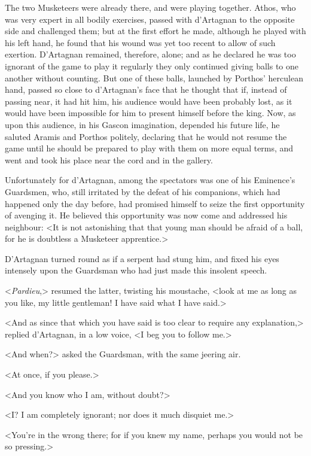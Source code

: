 The two Musketeers were already there, and were playing together. Athos, who was very expert in all bodily exercises, passed with d'Artagnan to the opposite side and challenged them; but at the first effort he made, although he played with his left hand, he found that his wound was yet too recent to allow of such exertion. D'Artagnan remained, therefore, alone; and as he declared he was too ignorant of the game to play it regularly they only continued giving balls to one another without counting. But one of these balls, launched by Porthos' herculean hand, passed so close to d'Artagnan's face that he thought that if, instead of passing near, it had hit him, his audience would have been probably lost, as it would have been impossible for him to present himself before the king. Now, as upon this audience, in his Gascon imagination, depended his future life, he saluted Aramis and Porthos politely, declaring that he would not resume the game until he should be prepared to play with them on more equal terms, and went and took his place near the cord and in the gallery. 

Unfortunately for d'Artagnan, among the spectators was one of his Eminence's Guardsmen, who, still irritated by the defeat of his companions, which had happened only the day before, had promised himself to seize the first opportunity of avenging it. He believed this opportunity was now come and addressed his neighbour: <It is not astonishing that that young man should be afraid of a ball, for he is doubtless a Musketeer apprentice.> 

D'Artagnan turned round as if a serpent had stung him, and fixed his eyes intensely upon the Guardsman who had just made this insolent speech. 

<\textit{Pardieu},> resumed the latter, twisting his moustache, <look at me as long as you like, my little gentleman! I have said what I have said.> 

<And as since that which you have said is too clear to require any explanation,> replied d'Artagnan, in a low voice, <I beg you to follow me.> 

<And when?> asked the Guardsman, with the same jeering air. 

<At once, if you please.> 

<And you know who I am, without doubt?> 

<I? I am completely ignorant; nor does it much disquiet me.> 

<You're in the wrong there; for if you knew my name, perhaps you would not be so pressing.> 


